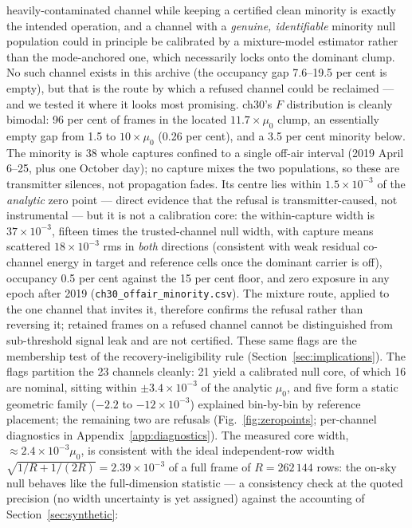 heavily-contaminated channel while keeping a certified clean minority
is exactly the intended operation, and a channel with a \emph{genuine,
identifiable} minority null population could in principle be
calibrated by a mixture-model estimator rather than the mode-anchored
one, which necessarily locks onto the dominant clump. No such channel
exists in this archive (the occupancy gap 7.6--19.5 per cent is
empty), but that is the route by which a refused channel could be
reclaimed --- and we tested it where it looks most promising. ch30's
$F$ distribution is cleanly bimodal: 96 per cent of frames in the
located $11.7\times\mu_0$ clump, an essentially empty gap from 1.5 to
$10\times\mu_0$ (0.26 per cent), and a 3.5 per cent minority below.
The minority is 38 whole captures confined to a single off-air
interval (2019 April 6--25, plus one October day); no capture mixes
the two populations, so these are transmitter silences, not
propagation fades. Its centre lies within $1.5\times10^{-3}$ of the
\emph{analytic} zero point --- direct evidence that the refusal is
transmitter-caused, not instrumental --- but it is not a calibration
core: the within-capture width is $37\times10^{-3}$, fifteen times
the trusted-channel null width, with capture means scattered
$18\times10^{-3}$ rms in \emph{both} directions (consistent with weak
residual co-channel energy in target and reference cells once the
dominant carrier is off), occupancy 0.5 per cent against the 15 per
cent floor, and zero exposure in any epoch after 2019
(\texttt{ch30\_offair\_minority.csv}). The mixture route, applied to
the one channel that invites it, therefore confirms the refusal
rather than reversing it; retained frames on a refused channel cannot
be distinguished from sub-threshold signal leak and are not
certified. 
These same flags are the membership test of the
recovery-ineligibility rule (Section~\ref{sec:implications}). The
flags partition the 23 channels cleanly: 21 yield a calibrated null
core, of
which 16 are nominal, sitting within $\pm 3.4\times10^{-3}$ of the
analytic $\mu_0$, and five form a static geometric family ($-2.2$ to
$-12\times10^{-3}$) explained bin-by-bin by reference placement; the
remaining two are refusals (Fig.~\ref{fig:zeropoints}; per-channel
diagnostics in Appendix~\ref{app:diagnostics}). The measured core width,
$\approx 2.4\times10^{-3}\mu_0$, is consistent with the ideal
independent-row width $\sqrt{1/R + 1/(2R)} = 2.39\times10^{-3}$ of a full
frame of $R = 262\,144$ rows: the on-sky null behaves like the
full-dimension statistic --- a consistency check at the quoted precision
(no width uncertainty is yet assigned) against the accounting of
Section~\ref{sec:synthetic}:


